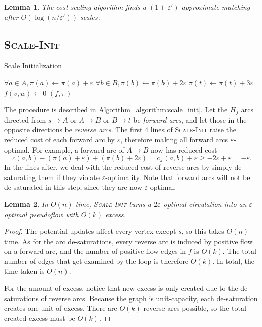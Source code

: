 \documentclass[11pt]{article}
\def\eps{\varepsilon}
\theoremstyle{plain}
\newtheorem{lemma}{Lemma}
\begin{document}
\begin{lemma}
\label{lemma:goldberg_scales}
	The cost-scaling algorithm finds a $(1 + \eps')$-approximate matching
	after $O(\log(n/\eps'))$ scales.
\end{lemma}

\subsection{\textsc{Scale-Init}}

\begin{algorithm}
\caption{Scale Initialization}
\label{algorithm:scale_init}
\begin{algorithmic}[1]
	\State $\forall a \in A, \pi(a) \gets \pi(a) + \eps$
	\State $\forall b \in B, \pi(b) \gets \pi(b) + 2\eps$
	\State $\pi(t) \gets \pi(t) + 3\eps$
	\Statex %
		\If{$c_\pi(w, v) < -\eps$}
			\State $f(v, w) \gets 0$
		\EndIf
	\EndFor
	\State\Return $(f, \pi)$
\EndFunction
\end{algorithmic}
\end{algorithm}

The procedure is described in Algorithm~\ref{algorithm:scale_init}.
Let the $H_f$ arcs directed from $s \to A$ or $A \to B$ or $B \to t$ be 
\emph{forward arcs}, and let those in the opposite directions be 
\emph{reverse arcs}.
The first 4 lines of \textsc{Scale-Init} raise the reduced cost of each
forward arc by $\eps$, therefore making all forward arcs $\eps$-optimal.
For example, a forward arc of $A \to B$ now has reduced cost
\begin{equation*}
	c(a, b) - (\pi(a) + \eps) + (\pi(b) + 2\eps) 
	= c_\pi(a, b) + \eps
	\geq -2\eps + \eps
	= -\eps.
\end{equation*}
In the lines after, we deal with the reduced cost of reverse arcs by simply
de-saturating them if they violate $\eps$-optimality.
Note that forward arcs will not be de-saturated in this step, since they are
now $\eps$-optimal.

\begin{lemma}
\label{lemma:scale_init}
	In $O(n)$ time, \textsc{Scale-Init} turns a $2\eps$-optimal circulation 
	into an $\eps$-optimal pseudoflow with $O(k)$ excess.
\end{lemma}
\begin{proof}
	The potential updates affect every vertex except $s$,
	so this takes $O(n)$ time.
	As for the arc de-saturations, every reverse arc is induced by positive 
	flow on a forward arc, and the number of positive flow edges in $f$ is 
	$O(k)$.
	The total number of edges that get examined by the loop is therefore 
	$O(k)$.
	In total, the time taken is $O(n)$.

	For the amount of excess, notice that new excess is only created due
	to the de-saturations of reverse arcs.
	Because the graph is unit-capacity, each de-saturation creates one unit 
	of excess.
	There are $O(k)$ reverse arcs possible, so the total created excess 
	must be $O(k)$.
\end{proof}
\end{document}
